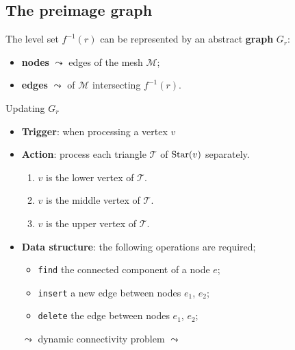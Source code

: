 \documentclass[10pt]{beamer}
\begin{document}
\subsection*{The preimage graph}
\begin{frame*}
The level set $f^{-1}(r)$ can be represented by an abstract \textbf{graph} $G_r$: %
\begin{itemize}
\item \textbf{nodes} $\leadsto$ edges of the mesh $\mathcal{M}$;
\item \textbf{edges} $\leadsto$  of $\mathcal{M}$ intersecting $f^{-1}(r)$.
\end{itemize}
\begin{block}{Updating $G_r$}
\begin{itemize}
\item \textbf{Trigger}:  when processing a vertex $v$\\
\item \textbf{Action}: process each triangle $\mathcal{T}$ of $\operatorname{Star}(v)$ separately.
\begin{enumerate}
\item $v$ is the lower vertex of $\mathcal{T}$.
\item $v$ is the middle vertex of $\mathcal{T}$.
\item $v$ is the upper vertex of $\mathcal{T}$.
\end{enumerate}
\item \textbf{Data structure}: the following operations are required;
\begin{itemize}
\item \texttt{find} the connected component of a node $e$;
\item \texttt{insert} a new edge between nodes $e_1$, $e_2$;
\item \texttt{delete} the edge between nodes $e_1$, $e_2$;
\end{itemize}
$\leadsto$  dynamic connectivity problem $\leadsto$ 
\end{itemize}
\end{block}
\end{frame*}
\end{document}
